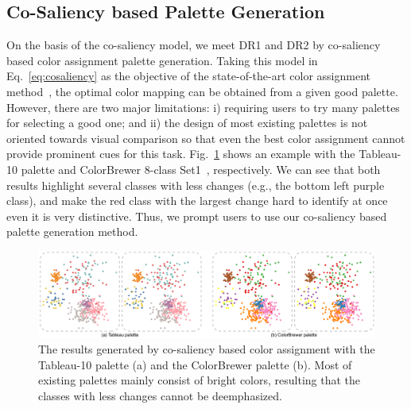 \subsection{Co-Saliency based Palette Generation}
\label{subsec:solver}
On the basis of the co-saliency model, we meet DR1 and DR2 by co-saliency based color assignment palette generation. Taking this model in Eq.~\ref{eq:cosaliency} as the objective of the state-of-the-art color assignment method~\cite{Wang2018}, the optimal color mapping can be obtained from a given good palette. However, there are two major limitations: i) requiring users to try many palettes for selecting a good one; and ii) the design of most existing palettes is not oriented towards visual comparison so that even the best color assignment cannot provide prominent cues for this task.
Fig.~\ref{fig:colorbrewer} shows an example with the Tableau-10 palette and ColorBrewer 8-class Set1~\cite{harrower2003colorbrewer}, respectively.  We can see that both results highlight several classes with less changes (e.g., the bottom left purple class), and make the red class with the largest change hard to identify at once even it is very distinctive. Thus, we prompt users to use our co-saliency based palette generation method.
 


\begin{figure}[!htb]
\centering
\includegraphics[width=1\columnwidth]{figures/colorbrewer.pdf}
\caption{The results generated by  co-saliency based color assignment with
 the Tableau-10 palette (a) and the ColorBrewer palette (b). Most of existing palettes mainly consist of bright colors, resulting that the classes with less changes cannot be deemphasized.}
\vspace*{-3mm}
\label{fig:colorbrewer}
\end{figure}

